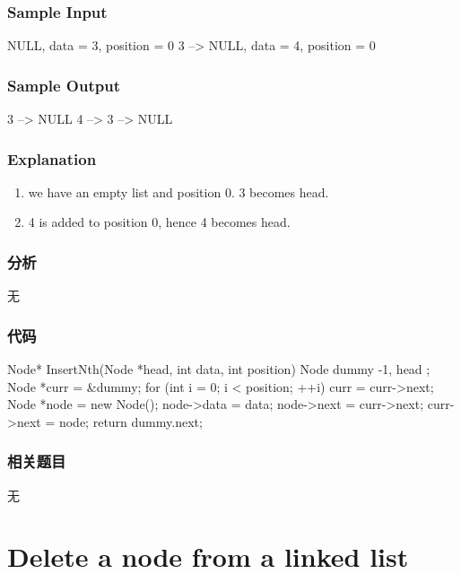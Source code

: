 \subsubsection{Sample Input}
\begin{Code}
NULL, data = 3, position = 0
3 –> NULL, data = 4, position = 0
\end{Code}


\subsubsection{Sample Output}
\begin{Code}
3 --> NULL
4 --> 3 --> NULL
\end{Code}


\subsubsection{Explanation}
\begin{enumerate}
\item we have an empty list and position 0. 3 becomes head.
\item 4 is added to position 0, hence 4 becomes head.
\end{enumerate}


\subsubsection{分析}
无


\subsubsection{代码}
\begin{Code}
Node* InsertNth(Node *head, int data, int position) {
    Node dummy{ -1, head };
    Node *curr = &dummy;
    for (int i = 0; i < position; ++i)
        curr = curr->next;
    Node *node = new Node();
    node->data = data;
    node->next = curr->next;
    curr->next = node;
    return dummy.next;
}
\end{Code}


\subsubsection{相关题目}
\begindot
\item 无
\myenddot


\section{Delete a node from a linked list} %
\label{sec:Delete-a-node-from-a-linked-list}

